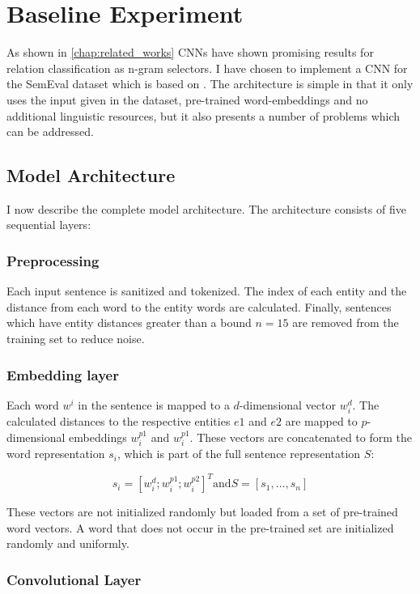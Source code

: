 
\section{Baseline Experiment}

As shown in \autoref{chap:related_works} CNNs have shown promising results for relation classification as n-gram selectors. I have chosen to implement a CNN for the SemEval dataset which is based on \cite{re_cnn}. The architecture is simple in that it only uses the input given in the dataset, pre-trained word-embeddings and no additional linguistic resources, but it also presents a number of problems which can be addressed. 

\subsection{Model Architecture}

I now describe the complete model architecture. The architecture consists of five sequential layers:

\subsubsection{Preprocessing}
Each input sentence is sanitized and tokenized. The index of each entity and the distance from each word to the entity words are calculated. 
Finally, sentences which have entity distances greater than a bound $n = 15$ are removed from the training set to reduce noise.


\subsubsection{Embedding layer}
Each word $w^i$ in the sentence is mapped to a $d$-dimensional vector $w_i^d$. The calculated distances to the respective entities $e1$ and $e2$ are mapped to $p$-dimensional embeddings $w_i^{p1}$ and $w_i^{p1}$. These vectors are concatenated to form the word representation $s_i$, which is part of the full sentence representation $S$:

$$
s_i = [w_i^d;w_i^{p1};w_i^{p2}]^T  \textrm{and} S = [s_1, \ldots, s_n]
$$

These vectors are not initialized randomly but loaded from a set of pre-trained word vectors. A word that does not occur in the pre-trained set are initialized randomly and uniformly.  

\subsubsection{Convolutional Layer}

